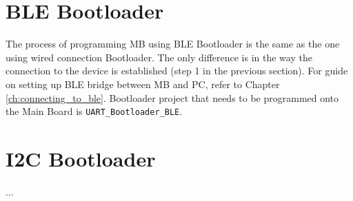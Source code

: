 \section{BLE Bootloader}

The process of programming MB using BLE Bootloader is the same as the one using wired connection Bootloader. The only difference is in the way the connection to the device is established (step 1 in the previous section). For guide on setting up BLE bridge between MB and PC, refer to Chapter \ref{ch:connecting_to_ble}. Bootloader project that needs to be programmed onto the Main Board is \texttt{UART\_Bootloader\_BLE}.

\section{I2C Bootloader}

...